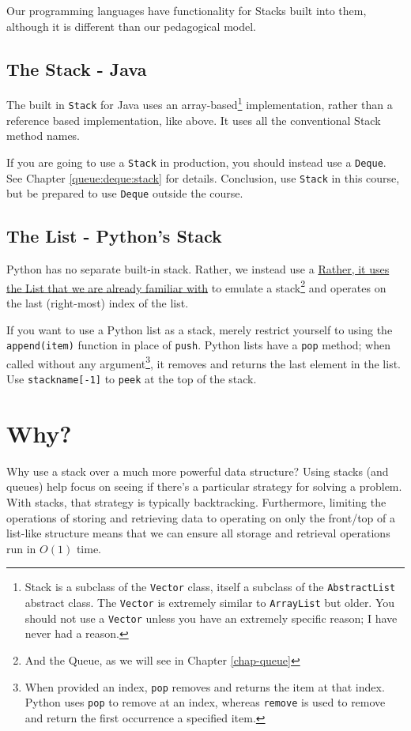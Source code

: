 Our programming languages have functionality for Stacks built into them, although it is different than our pedagogical model.
\subsection{The Stack - Java}
The built in \texttt{Stack} for Java uses an array-based\footnote{Stack is a subclass of the \texttt{Vector} class, itself a subclass of the \texttt{AbstractList} abstract class.  The \texttt{Vector} is extremely similar to \texttt{ArrayList} but older.  You should not use a \texttt{Vector} unless you have an extremely specific reason;  I have never had a reason.} implementation, rather than a reference based implementation, like above.  It uses all the conventional Stack method names.

If you are going to use a \texttt{Stack} in production, you should instead use a \texttt{Deque}.  See Chapter \ref{queue:deque:stack} for details.
Conclusion, use \texttt{Stack} in this course, but be prepared to use \texttt{Deque} outside the course.


\subsection{The List - Python's Stack}
Python has no separate built-in stack. Rather, we instead use a  \href{https://docs.python.org/3/tutorial/datastructures.html#using-lists-as-stacks} {Rather, it uses the List that we are already familiar with} to emulate a stack\footnote{And the Queue, as we will see in Chapter \ref{chap-queue}} and operates on the last (right-most) index of the list.

If you want to use a Python list as a stack, merely restrict yourself to using the \texttt{append(item)} function in place of \texttt{push}.
Python lists have a \texttt{pop} method;  when called without any argument\footnote{When provided an index, \texttt{pop} removes and returns the item at that index.  
Python uses \texttt{pop} to remove at an index, whereas \texttt{remove} is used to remove and return the first occurrence a specified item.},  it removes and returns the last element in the list.
Use \texttt{stackname[-1]} to \texttt{peek} at the top of the stack.


\section{Why?}
Why use a stack over a much more powerful data structure?    Using stacks (and queues) help focus on seeing if there's a particular strategy for solving a problem.  With stacks, that strategy is typically backtracking.   Furthermore, limiting the operations of storing and retrieving data to operating on only the front/top of a list-like structure means that we can ensure all storage and retrieval operations run in $O(1)$ time.


